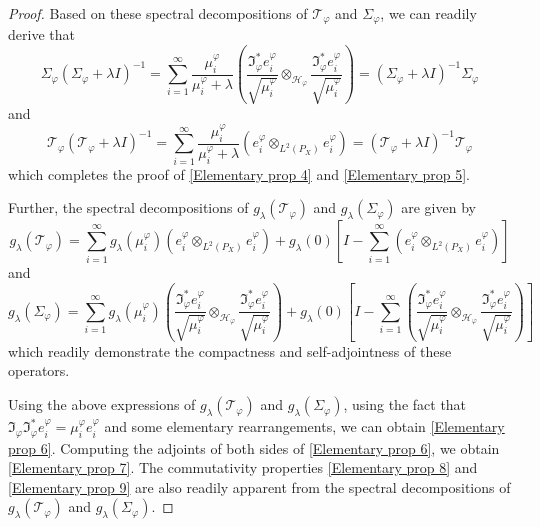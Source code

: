 \documentclass{article} %
\newcommand{\I}{\mathfrak{I}}
\newcommand{\rep}{\varphi}
\newcommand{\Hrep}{\mathcal{H}_{\varphi}}
\newcommand{\Srep}{\Sigma_{\rep}}
\newcommand{\Sreplambdainv}{(\Srep+\lambda I)^{-1}}
\newcommand{\Trep}{\mathcal{T}_{\rep}}
\newcommand{\Treplambdainv}{(\Trep+\lambda I)^{-1}}
\newcommand{\Irep}{\I_{\rep}}
\newcommand{\Irepad}{\Irep^{*}}
\newcommand{\gl}{g_{\lambda}}
\newcommand{\LPtwo}{L^{2}(P_{X})}
\theoremstyle{plain}
\begin{document}
\begin{proof}
    Based on these spectral decompositions of $\Trep$ and $\Srep$, we can readily derive that
    \begin{equation*}
        \Srep \Sreplambdainv = \sum_{i=1}^{\infty} \frac{\mu_{i}^{\rep}}{\mu_{i}^{\rep} + \lambda} \left(\frac{\Irepad e_{i}^{\rep}}{\sqrt{\mu_{i}^{\rep}}} \otimes_{\Hrep} \frac{\Irepad e_{i}^{\rep}}{\sqrt{\mu_{i}^{\rep}}}\right)=\Sreplambdainv \Srep
    \end{equation*}
    and 
    \begin{equation*}
        \Trep \Treplambdainv = \sum_{i=1}^{\infty} \frac{\mu_{i}^{\rep}}{\mu_{i}^{\rep} + \lambda} \left(e_{i}^{\rep} \otimes_{\LPtwo} e_{i}^{\rep}\right)=\Treplambdainv \Trep
    \end{equation*}
   which completes the proof of \ref{Elementary prop 4} and \ref{Elementary prop 5}. 

   Further, the spectral decompositions of $\gl(\Trep)$ and $\gl(\Srep)$ are given by
   \begin{equation*}\label{Spectral decomposition of spectral reg of Trep}
        \gl(\Trep) = \sum_{i=1}^{\infty} \gl(\mu_{i}^{\rep}) \left(e_{i}^{\rep} \otimes_{\LPtwo} e_{i}^{\rep}\right) + \gl(0) \left[I-  \sum_{i=1}^{\infty}  \left(e_{i}^{\rep} \otimes_{\LPtwo} e_{i}^{\rep}\right) \right]
    \end{equation*}
    and
    \begin{equation*}\label{Spectral decomposition of spectral reg of Srep}
        \gl(\Srep) = \sum_{i=1}^{\infty} \gl(\mu_{i}^{\rep}) \left(\frac{\Irepad e_{i}^{\rep}}{\sqrt{\mu_{i}^{\rep}}} \otimes_{\Hrep} \frac{\Irepad e_{i}^{\rep}}{\sqrt{\mu_{i}^{\rep}}}\right) + \gl(0) \left[I-  \sum_{i=1}^{\infty} \left(\frac{\Irepad e_{i}^{\rep}}{\sqrt{\mu_{i}^{\rep}}} \otimes_{\Hrep} \frac{\Irepad e_{i}^{\rep}}{\sqrt{\mu_{i}^{\rep}}}\right) \right]
    \end{equation*}
    which readily demonstrate the compactness and self-adjointness of these operators.

    Using the above expressions of $\gl(\Trep)$ and $\gl(\Srep)$, using the fact that $\Irep \Irepad e_{i}^{\rep} = \mu_{i}^{\rep} e_{i}^{\rep}$ and some elementary rearrangements, we can obtain \ref{Elementary prop 6}. Computing the adjoints of both sides of \ref{Elementary prop 6}, we obtain \ref{Elementary prop 7}. The commutativity properties \ref{Elementary prop 8} and \ref{Elementary prop 9} are also readily apparent from the spectral decompositions of $\gl(\Trep)$ and $\gl(\Srep)$.


\end{proof}
\end{document}

